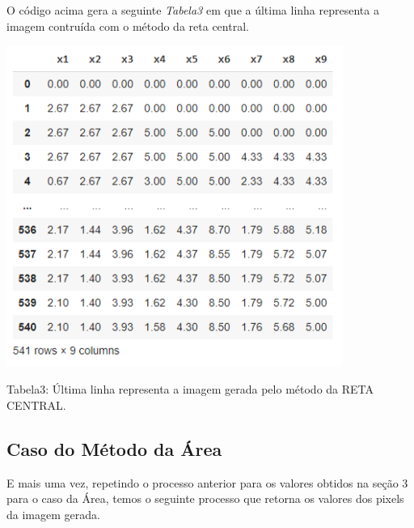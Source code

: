 \documentclass[a4paper, 12pt]{article}
\begin{document}
O código acima gera a seguinte \textit{Tabela3} em que a última linha representa a imagem contruída com o método da reta central.

\begin{center}
\includegraphics[width=11cm]{110_saida_tabela_3.PNG}

Tabela3: Última linha representa a imagem gerada pelo método da RETA CENTRAL.   
    
\end{center}

\subsection{Caso do Método da Área}

E mais uma vez, repetindo o processo anterior para os valores obtidos na seção 3 para o caso da Área, temos o seguinte processo que retorna os valores dos pixels da imagem gerada.
\end{document}
